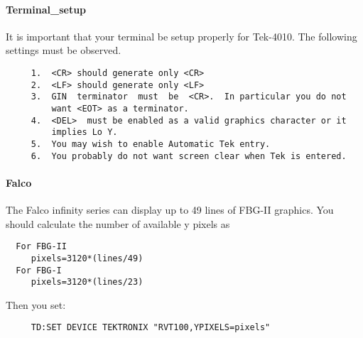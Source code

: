 \paragraph{Terminal\_setup}
It  is important that your terminal be setup properly for Tek-4010.
The following settings must be observed.  
\begin{verbatim}
     1.  <CR> should generate only <CR> 
     2.  <LF> should generate only <LF> 
     3.  GIN  terminator  must  be  <CR>.  In particular you do not
         want <EOT> as a terminator.  
     4.  <DEL>  must be enabled as a valid graphics character or it
         implies Lo Y.  
     5.  You may wish to enable Automatic Tek entry.  
     6.  You probably do not want screen clear when Tek is entered. 
\end{verbatim}
\paragraph{Falco}
The  Falco  infinity  series  can  display up to 49 lines of FBG-II
graphics.  You should calculate the number of available y pixels as 
\begin{verbatim}
  For FBG-II 
     pixels=3120*(lines/49) 
  For FBG-I 
     pixels=3120*(lines/23) 
\end{verbatim}
Then you set:  
\begin{verbatim}
     TD:SET DEVICE TEKTRONIX "RVT100,YPIXELS=pixels" 
\end{verbatim}
